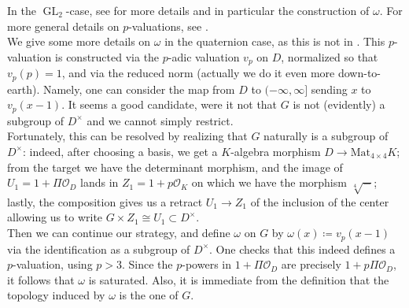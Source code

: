 \documentclass[11pt, oneside]{article}
\DeclareMathOperator{\GL}{GL}
\theoremstyle{definition}
\begin{document}
	In the $\GL_2$-case, see \cite[\S5.3]{BHHMS1} for more details and in particular the construction of $\omega$. For more general details on $p$-valuations, see \cite[Ch.~V]{Schneider2011}.\\ We give some more details on $\omega$ in the quaternion case, as this is not in \cite{hu2024modprepresentationsquaternion}. This $p$-valuation is constructed via the $p$-adic valuation $v_p$ on $D$, normalized so that $v_p(p)=1$, and via the reduced norm (actually we do it even more down-to-earth). Namely, one can consider the map from $D$ to $(-\infty,\infty]$ sending $x$ to $v_p(x-1)$. It seems a good candidate, were it not that $G$ is not (evidently) a subgroup of $D^\times$ and we cannot simply restrict.\\
	Fortunately, this can be resolved by realizing that $G$ naturally is a subgroup of $D^\times$: indeed, after choosing a basis, we get a $K$-algebra morphism $D\to\text{Mat}_{4\times4}K$; from the target we have the determinant morphism, and the image of $U_1=1+\Pi\mathcal O_D$ lands in $Z_1=1+p\mathcal O_K$ on which we have the morphism $\sqrt[4]-$; lastly, the composition gives us a retract $U_1\to Z_1$ of the inclusion of the center allowing us to write $G\times Z_1\cong U_1\subset D^\times$.\\
	Then we can continue our strategy, and define $\omega$ on $G$ by $\omega(x)\coloneqq v_p(x-1)$ via the identification as a subgroup of $D^\times$. One checks that this indeed defines a $p$-valuation, using $p>3$. Since the $p$-powers in $1+\Pi\mathcal O_D$ are precisely $1+p\Pi\mathcal O_D$, it follows that $\omega$ is saturated. Also, it is immediate from the definition that the topology induced by $\omega$ is the one of $G$.
\end{document}
